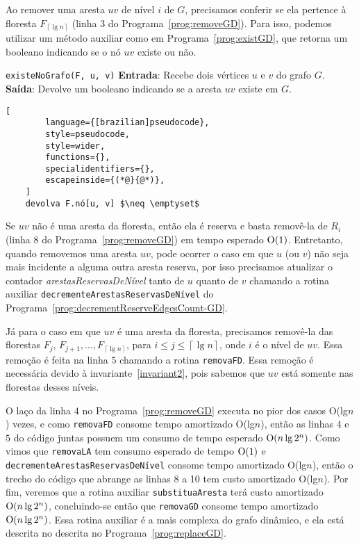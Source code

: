 Ao remover uma aresta $uv$ de nível $i$ de $G$, precisamos conferir se ela pertence à floresta $F_{\left\lceil \lg n \right\rceil}$ (linha $3$ do Programa~\ref{prog:removeGD}). Para isso, podemos utilizar um método auxiliar como em Programa~\ref{prog:existGD}, que retorna um booleano indicando se o nó $uv$ existe ou não.

\begin{programruledcaption}{\texttt{existeNoGrafo(F, u, v)} \label{prog:existGD}}
    \noindent\textbf{Entrada}: Recebe dois vértices $u$ e $v$ do grafo $G$. \\
    \textbf{Saída}: Devolve um booleano indicando se a aresta $uv$ existe em $G$.
    \vspace{-0.5\baselineskip}
    \begin{lstlisting}[
        language={[brazilian]pseudocode},
        style=pseudocode,
        style=wider,
        functions={},
        specialidentifiers={},
        escapeinside={(*@}{@*)},
    ]
    devolva F.nó[u, v] $\neq \emptyset$ 
    \end{lstlisting}
    \vspace{-0.5\baselineskip}
\end{programruledcaption}

Se $uv$ não é uma aresta da floresta, então ela é reserva e basta removê-la de $R_i$ (linha $8$ do Programa~\ref{prog:removeGD}) em tempo esperado $\mathrm{O}(1)$. Entretanto, quando removemos uma aresta $uv$, pode ocorrer o caso em que $u$ (ou $v$) não seja mais incidente a alguma outra aresta reserva, por isso precisamos atualizar o contador \textit{arestasReservasDeNível} tanto de $u$ quanto de $v$ chamando a rotina auxiliar \texttt{decrementeArestasReservasDeNível} do Programa~\ref{prog:decrementReserveEdgesCount-GD}.

Já para o caso em que $uv$ é uma aresta da floresta, precisamos removê-la das florestas $F_j$, $F_{j+1}, \ldots, F_{\left\lceil \lg n \right\rceil}$, para $i \leq j \leq \left\lceil \lg n \right\rceil$, onde $i$ é o nível de $uv$. Essa remoção é feita na linha $5$ chamando a rotina \texttt{removaFD}. Essa remoção é necessária devido à invariante~\ref{invariant2}, pois sabemos que $uv$ está somente nas florestas desses níveis. 

O laço da linha $4$ no Programa~\ref{prog:removeGD} executa no pior dos casos O(lg$n$) vezes, e como \texttt{removaFD} consome tempo amortizado O(lg$n$), então as linhas $4$ e $5$ do código juntas possuem um consumo de tempo esperado $\mathrm{O}(n \lg 2^n)$. Como vimos que \texttt{removaLA} tem consumo esperado de tempo $\mathrm{O}(1)$ e \texttt{decrementeArestasReservasDeNível} consome tempo amortizado O(lg$n$), então o trecho do código que abrange as linhas 8 a 10 tem custo amortizado O(lg$n$). Por fim, veremos que a rotina auxiliar \texttt{substituaAresta} terá custo amortizado $\mathrm{O}(n \lg 2^n)$, concluindo-se então que \texttt{removaGD} consome tempo amortizado $\mathrm{O}(n \lg 2^n)$. Essa rotina auxiliar é a mais complexa do grafo dinâmico, e ela está descrita no descrita no Programa~\ref{prog:replaceGD}.

